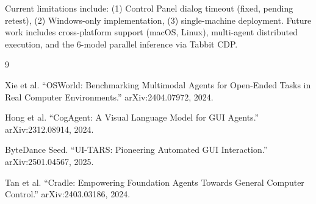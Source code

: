 \documentclass{article}
\begin{document}
Current limitations include: (1) Control Panel dialog timeout (fixed, pending retest), (2) Windows-only implementation, (3) single-machine deployment. Future work includes cross-platform support (macOS, Linux), multi-agent distributed execution, and the 6-model parallel inference via Tabbit CDP.


\begin{thebibliography}{9}

Xie et al.
``OSWorld: Benchmarking Multimodal Agents for Open-Ended Tasks in Real Computer Environments.''
arXiv:2404.07972, 2024.

Hong et al.
``CogAgent: A Visual Language Model for GUI Agents.''
arXiv:2312.08914, 2024.

ByteDance Seed.
``UI-TARS: Pioneering Automated GUI Interaction.''
arXiv:2501.04567, 2025.

Tan et al.
``Cradle: Empowering Foundation Agents Towards General Computer Control.''
arXiv:2403.03186, 2024.

\end{thebibliography}
\end{document}
